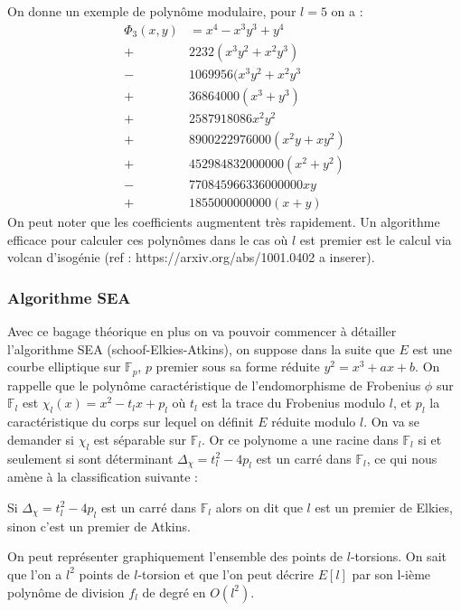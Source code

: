 \documentclass{article}
\begin{document}
On donne un exemple de polynôme modulaire, pour $ l =5$ on a :
\begin{align*}
\Phi_3(x,y) &= x^4 -x^3y^3 + y^4 \\
 +& 2232(x^3y^2 + x^2y^3) \\
 -& 1069956(x^3y^2 + x^2y^3 \\
 +& 36864000(x^3 + y^3) \\
 +& 2587918086x^2y^2 \\
 +& 8900222976000(x^2y + xy^2) \\
 +& 452984832000000(x^2 + y^2) \\
 -& 770845966336000000xy \\
 +& 1855000000000(x+y) 
\end{align*}
On peut noter que les coefficients augmentent très rapidement. Un algorithme efficace pour calculer ces polynômes dans le cas où $l$ est premier est le calcul via volcan d'isogénie (ref : https://arxiv.org/abs/1001.0402 a inserer).

\subsubsection{Algorithme SEA}
Avec ce bagage théorique en plus on va pouvoir commencer à détailler l'algorithme SEA (schoof-Elkies-Atkins), on suppose dans la suite que $E$ est une courbe elliptique sur $\mathbb{F}_p$, $p$ premier sous sa forme réduite $y^2 = x^3 + ax +b$. On rappelle que le polynôme caractéristique de l’endomorphisme de Frobenius $\phi$ sur $\mathbb{F}_l$ est $\chi_l(x) = x^2 - t_lx +p_l$ où $t_l$ est la trace du Frobenius modulo $l$, et $p_l$ la caractéristique du corps sur lequel on définit $E$ réduite modulo $l$. On va se demander si $\chi_l$ est séparable sur $\mathbb{F}_l$. Or ce polynome a une racine dans $\mathbb{F}_l$ si et seulement si sont déterminant $\Delta_{\chi} = t_l^2 - 4p_l$ est un carré dans $\mathbb{F}_l$, ce qui nous amène à la classification suivante :

\begin{defi}
\label{Atkins's prime}
Si $\Delta_{\chi} = t_l^2 - 4p_l$ est un carré dans $\mathbb{F}_l$ alors on dit que $l$ est un premier de Elkies, sinon c'est un premier de Atkins.
\end{defi}
\bigskip
On peut représenter graphiquement l'ensemble des points de $l$-torsions. On sait que l'on a $l^2$ points de $l$-torsion et que l'on peut décrire $E[l]$ par son l-ième polynôme de division $f_l$ de degré en $O(l^2)$.

\end{document}
